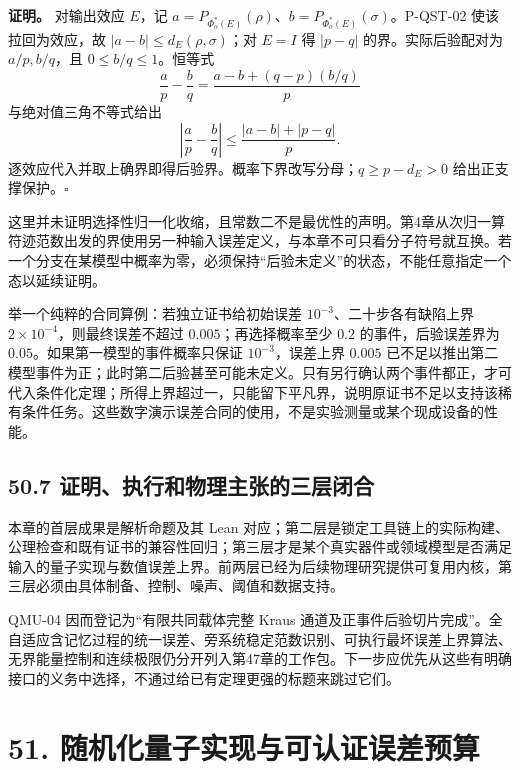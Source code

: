 \documentclass[
  11pt,
  oneside]{book}
\begin{document}
\textbf{证明。} 对输出效应 \(E\)，记
\(a=P_{\Phi_o^*(E)}(\rho)\)、\(b=P_{\Phi_o^*(E)}(\sigma)\)。P-QST-02
使该拉回为效应，故 \(|a-b|\le d_E(\rho,\sigma)\)；对 \(E=I\) 得
\(|p-q|\) 的界。实际后验配对为 \(a/p,b/q\)，且 \(0\le b/q\le1\)。恒等式
\[
\frac ap-\frac bq=
\frac{a-b+(q-p)(b/q)}p
\] 与绝对值三角不等式给出 \[
\left|\frac ap-\frac bq\right|
\le\frac{|a-b|+|p-q|}{p}.
\] 逐效应代入并取上确界即得后验界。概率下界改写分母；\(q\ge p-d_E>0\)
给出正支撑保护。\(\square\)

这里并未证明选择性归一化收缩，且常数二不是最优性的声明。第4章从次归一算符迹范数出发的界使用另一种输入误差定义，与本章不可只看分子符号就互换。若一个分支在某模型中概率为零，必须保持``后验未定义''的状态，不能任意指定一个态以延续证明。

举一个纯粹的合同算例：若独立证书给初始误差
\(10^{-3}\)、二十步各有缺陷上界 \(2\times10^{-4}\)，则最终误差不超过
\(0.005\)；再选择概率至少 \(0.2\) 的事件，后验误差界为
\(0.05\)。如果第一模型的事件概率只保证 \(10^{-3}\)，误差上界 \(0.005\)
已不足以推出第二模型事件为正；此时第二后验甚至可能未定义。只有另行确认两个事件都正，才可代入条件化定理；所得上界超过一，只能留下平凡界，说明原证书不足以支持该稀有条件任务。这些数字演示误差合同的使用，不是实验测量或某个现成设备的性能。

\hypertarget{ux8bc1ux660eux6267ux884cux548cux7269ux7406ux4e3bux5f20ux7684ux4e09ux5c42ux95edux5408}{%
\section{50.7
证明、执行和物理主张的三层闭合}\label{ux8bc1ux660eux6267ux884cux548cux7269ux7406ux4e3bux5f20ux7684ux4e09ux5c42ux95edux5408}}

本章的首层成果是解析命题及其 Lean
对应；第二层是锁定工具链上的实际构建、公理检查和既有证书的兼容性回归；第三层才是某个真实器件或领域模型是否满足输入的量子实现与数值误差上界。前两层已经为后续物理研究提供可复用内核，第三层必须由具体制备、控制、噪声、阈值和数据支持。

QMU-04 因而登记为``有限共同载体完整 Kraus
通道及正事件后验切片完成''。全自适应含记忆过程的统一误差、旁系统稳定范数识别、可执行最坏误差上界算法、无界能量控制和连续极限仍分开列入第47章的工作包。下一步应优先从这些有明确接口的义务中选择，不通过给已有定理更强的标题来跳过它们。

\hypertarget{ch-51}{%
\chapter{51. 随机化量子实现与可认证误差预算}\label{ch-51}}
\end{document}
